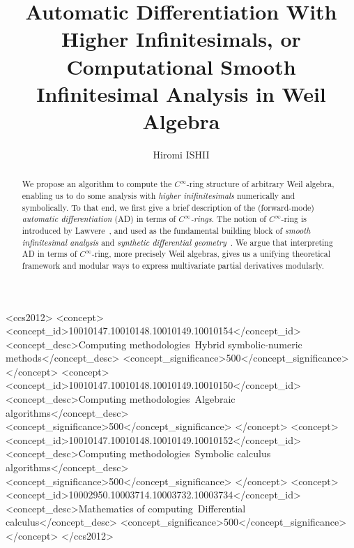\documentclass[%
  sigconf,authorversion,screen]{acmart}
\begin{document}
\title[Automatic Differentiation With Higher Infinitesimals]{Automatic Differentiation With Higher Infinitesimals, or Computational Smooth Infinitesimal Analysis in Weil Algebra}

\author{Hiromi ISHII}

\renewcommand{\shortauthors}{Hiromi ISHII}

\begin{abstract}
  \frenchspacing
  We propose an algorithm to compute the $C^\infty$-ring structure of arbitrary Weil algebra, enabling us to do some analysis with \emph{higher inifinitesimals} numerically and symbolically.
  To that end, we first give a brief description of the (forward-mode) \emph{automatic differentiation} (AD) in terms of \emph{$C^\infty$-rings}.
  The notion of $C^\infty$-ring is introduced by Lawvere~\cite{lawvere1979categorical}, and used as the fundamental building block of \emph{smooth infinitesimal analysis} and \emph{synthetic differential geometry}~\cite{Moerdijk:1991aa}.
  We argue that interpreting AD in terms of $C^\infty$-ring, more precisely Weil algebras, gives us a unifying theoretical framework and modular ways to express multivariate partial derivatives modularly.
\end{abstract}

\begin{CCSXML}
<ccs2012>
    <concept>
        <concept_id>10010147.10010148.10010149.10010154</concept_id>
        <concept_desc>Computing methodologies~Hybrid symbolic-numeric methods</concept_desc>
        <concept_significance>500</concept_significance>
        </concept>
    <concept>
        <concept_id>10010147.10010148.10010149.10010150</concept_id>
        <concept_desc>Computing methodologies~Algebraic algorithms</concept_desc>
        <concept_significance>500</concept_significance>
        </concept>
    <concept>
        <concept_id>10010147.10010148.10010149.10010152</concept_id>
        <concept_desc>Computing methodologies~Symbolic calculus algorithms</concept_desc>
        <concept_significance>500</concept_significance>
        </concept>
    <concept>
        <concept_id>10002950.10003714.10003732.10003734</concept_id>
        <concept_desc>Mathematics of computing~Differential calculus</concept_desc>
        <concept_significance>500</concept_significance>
        </concept>
  </ccs2012>
\end{CCSXML}
\end{document}
